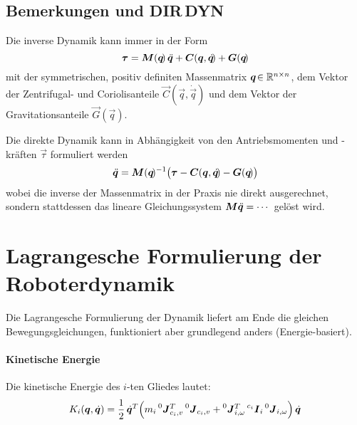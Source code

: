 		\subsection{Bemerkungen und DIR\,DYN}
			Die inverse Dynamik \INVDYN kann immer in der Form
			\begin{equation*}
				\bm{\tau} = \bm{M}(\bm{q}\!)\, \ddot{\bm{q}} + \bm{C}(\bm{q}, \dot{\bm{q}}\!) + \bm{G}(\bm{q}\!)
			\end{equation*}
			mit der symmetrischen, positiv definiten Massenmatrix \( \bm{\bm{q}\!} \in \mathbb{R}^{n \times n} \), dem Vektor der Zentrifugal- und Coriolisanteile \( \vec{C}(\vec{q}, \dot{\vec{q}}\!) \) und dem Vektor der Gravitationsanteile \( \vec{G}(\vec{q}\!) \).

			Die direkte Dynamik \DIRDYN kann in Abhängigkeit von den Antriebsmomenten und -kräften \(\vec{\tau}\) formuliert werden
			\begin{equation*}
				\ddot{\bm{q}} = \bm{M}(\bm{q}\!)^{-1} \big( \bm{\tau} - \bm{C}(\bm{q}, \dot{\bm{q}}\!) - \bm{G}(\bm{q}\!) \big)
			\end{equation*}
			wobei die inverse der Massenmatrix in der Praxis nie direkt ausgerechnet, sondern stattdessen das lineare Gleichungssystem \( \bm{M} \ddot{\bm{q}} = \cdots \) gelöst wird.

	\section{Lagrangesche Formulierung der Roboterdynamik}
		Die Lagrangesche Formulierung der Dynamik liefert am Ende die gleichen Bewegungsgleichungen, funktioniert aber grundlegend anders (Energie-basiert).

		\paragraph{Kinetische Energie}
			Die kinetische Energie des \(i\)-ten Gliedes lautet:
			\begin{equation*}
				K_i(\bm{q}, \dot{\bm{q}}) = \frac{1}{2}\, \dot{\bm{q}}^T \Big( m_i \prescript{0}{}{\bm{J}}_{c_i, v}^T \prescript{0}{}{\bm{J}}_{c_i, v} + \prescript{0}{}{\bm{J}}_{i, \omega}^T \prescript{c_i}{}{\bm{I}}_i \prescript{0}{}{\bm{J}}_{i, \omega} \Big)\, \dot{\bm{q}}
			\end{equation*}

